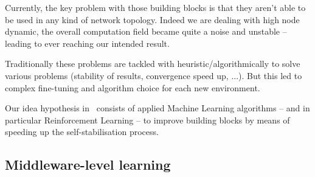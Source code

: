 \documentclass[11pt]{article}
\begin{document}
Currently, the key problem with those building blocks is that they aren't able to be used in any kind of network topology. Indeed we are dealing with high node dynamic, the overall computation field became quite a noise and unstable -- leading to ever reaching our intended result.

Traditionally these problems are tackled with heuristic/algorithmically to solve various problems (stability of results, convergence speed up, ...). But this led to complex fine-tuning and algorithm choice for each new environment.

Our idea hypothesis in~\cite{research} consists of applied Machine Learning algorithms -- and in particular Reinforcement Learning -- to improve building blocks by means of speeding up the self-stabilisation process.
\subsection{Middleware-level learning}



\end{document}
